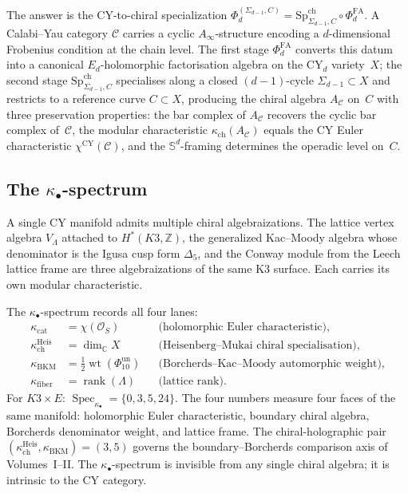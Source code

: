 \documentclass[11pt]{article}
\theoremstyle{plain}
\theoremstyle{definition}
\theoremstyle{remark}
\newcommand{\cC}{\mathcal{C}}
\newcommand{\cO}{\mathcal{O}}
\newcommand{\bC}{\mathbb{C}}
\newcommand{\bS}{\mathbb{S}}
\newcommand{\bZ}{\mathbb{Z}}
\newcommand{\Ainf}{A_\infty}
\newcommand{\Sd}{\bS^d}
\newcommand{\CY}{\mathrm{CY}}
\newcommand{\SpCh}{\mathrm{Sp}^{\mathrm{ch}}}
\DeclareMathOperator{\Spec}{Spec}
\begin{document}
The answer is the CY-to-chiral specialization
$\Phi_d^{(\Sigma_{d-1},C)} = \SpCh_{\Sigma_{d-1}, C} \circ \Phi^{\mathrm{FA}}_d$.
A Calabi--Yau category $\cC$ carries a cyclic $\Ainf$-structure
encoding a $d$-dimensional Frobenius condition at the chain level.
The first stage $\Phi^{\mathrm{FA}}_d$ converts this datum into a
canonical $E_d$-holomorphic factorisation algebra on the CY$_d$
variety~$X$; the second stage $\SpCh_{\Sigma_{d-1}, C}$
specialises along a closed $(d-1)$-cycle $\Sigma_{d-1} \subset X$
and restricts to a reference curve $C \subset X$, producing the
chiral algebra $A_\cC$ on~$C$ with three preservation properties:
the bar complex of $A_\cC$ recovers the cyclic bar complex
of~$\cC$, the modular characteristic $\kappa_{\mathrm{ch}}(A_\cC)$
equals the CY Euler characteristic $\chi^{\CY}(\cC)$, and the
$\Sd$-framing determines the operadic level on~$C$.

\subsection{The $\kappa_\bullet$-spectrum}

A single CY manifold admits multiple chiral algebraizations.  The
lattice vertex algebra $V_\Lambda$ attached to $H^*(K3, \bZ)$,
the generalized Kac--Moody algebra whose denominator is the Igusa
cusp form $\Delta_5$, and the Conway module from the Leech lattice
frame are three algebraizations of the same K3 surface.  Each
carries its own modular characteristic.

The $\kappa_\bullet$-spectrum records all four lanes:
\begin{align*}
 \kappa_{\mathrm{cat}} &= \chi(\cO_S)
   &&\text{(holomorphic Euler characteristic)}, \\
 \kappa_{\mathrm{ch}}^{\mathrm{Heis}} &= \dim_\bC X
   &&\text{(Heisenberg--Mukai chiral specialisation)}, \\
 \kappa_{\mathrm{BKM}} &= \tfrac{1}{2}\operatorname{wt}(\Phi_{10}^{\mathrm{un}})
   &&\text{(Borcherds--Kac--Moody automorphic weight)}, \\
 \kappa_{\mathrm{fiber}} &= \operatorname{rank}(\Lambda)
   &&\text{(lattice rank)}.
\end{align*}
For $K3 \times E$:
$\Spec_{\kappa_\bullet} = \{0, 3, 5, 24\}$.  The four numbers
measure four faces of the same manifold: holomorphic Euler
characteristic, boundary chiral algebra, Borcherds denominator weight,
and lattice frame.  The chiral-holographic pair
$(\kappa_{\mathrm{ch}}^{\mathrm{Heis}}, \kappa_{\mathrm{BKM}}) = (3, 5)$ governs
the boundary--Borcherds comparison axis of Volumes~I--II.  The
$\kappa_\bullet$-spectrum is invisible from any single chiral
algebra; it is intrinsic to the CY category.
\end{document}
